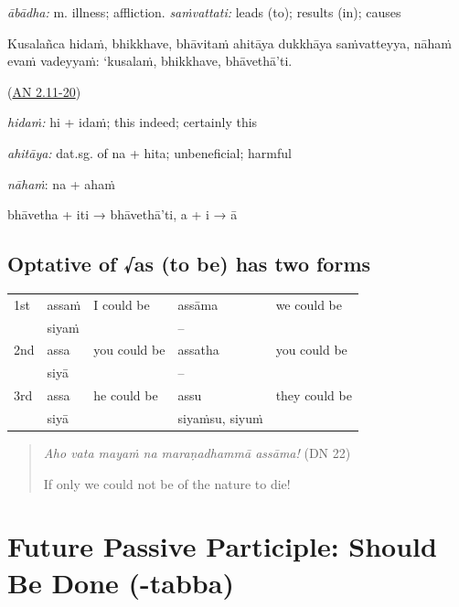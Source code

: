 \documentclass[11pt,oneside]{memoir}
\begin{document}
\normalArrayStrech
\vspace*{-0.5\baselineskip}

\emph{ābādha:} m. illness; affliction. \emph{saṁvattati:} leads (to); results (in); causes

\bigskip

\begin{widecols}
Kusalañca hidaṁ, bhikkhave, bhāvitaṁ ahitāya dukkhāya saṁvatteyya, nāhaṁ evaṁ
vadeyyaṁ: `kusalaṁ, bhikkhave, bhāvethā'ti.

(\href{https://suttacentral.net/an2.11-20/pli/ms}{AN 2.11-20})

\columnbreak

\emph{hidaṁ:} hi + idaṁ; this indeed; certainly this

\emph{ahitāya:} dat.sg. of na + hita; unbeneficial; harmful

\emph{nāhaṁ}: na + ahaṁ

bhāvetha + iti → bhāvethā'ti, a + i → ā
\end{widecols}

\subsection{Optative of √as (to be) has two forms}
\label{sec:orga4dd9f1}

\begin{center}
\begin{tabular}{lllll}
1st & assaṁ & I could be & assāma & we could be\\[0pt]
 & siyaṁ &  & -- & \\[0pt]
\hline
2nd & assa & you could be & assatha & you could be\\[0pt]
 & siyā &  & -- & \\[0pt]
\hline
3rd & assa & he could be & assu & they could be\\[0pt]
 & siyā &  & siyaṁsu, siyuṁ & \\[0pt]
\end{tabular}
\end{center}

\begin{quote}
\emph{Aho vata mayaṁ na maraṇadhammā assāma!} (DN 22)

If only we could not be of the nature to die!
\end{quote}

\section{Future Passive Participle: Should Be Done (-tabba)}
\label{sec:orgbf11536}
\end{document}
